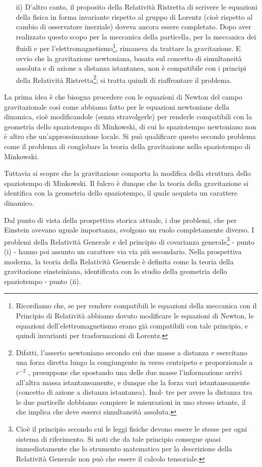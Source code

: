 \begin{enumerate}
 \item[ii)] D'altro canto, il proposito della Relatività Ristretta di scrivere le equazioni 
della fisica in forma invariante rispetto al gruppo di Lorentz (cioè
rispetto al cambio di osservatore inerziale) doveva ancora essere completato. 
Dopo aver realizzato questo scopo per la meccanica della particella, per la meccanica dei fluidi 
e per 
l'elettromagnetismo\footnote{Ricordiamo che, se per rendere compatibili le equazioni della meccanica con il Principio
di Relatività abbiamo dovuto modificare le equazioni di Newton, le equazioni dell'elettromagnetismo erano 
già compatibili con tale principio, e quindi invarianti per trasformazioni di Lorentz.},
rimaneva da trattare la gravitazione. E ovvio che la gravitazione newtoniana, 
basata sul concetto di simultaneità assoluta e di azione a distanza istantanea, non è compatibile con i principi 
della Relatività Ristretta\footnote{Difatti, l'asserto newtoniano secondo cui due masse a distanza $r$ esercitano una forza
diretta lungo la congiungente in verso centripeto e proporzionale a $r^{-2}$ , presuppone che
spostando una delle due masse l'informazione arrivi all'altra massa istantaneamente, e
dunque che la forza vari istantaneamente (concetto di azione a distanza istantanea). Inol-
tre per avere la distanza tra le due particelle dobbiamo compiere le misurazioni in uno
stesso istante, il che implica che deve esserci simultaneità assoluta.};
si tratta quindi di riaffrontare il problema.
\end{enumerate}

La prima idea è che bisogna procedere con le equazioni di Newton del 
campo gravitazionale così come abbiamo fatto per le equazioni newtoniane 
della dinamica, cioè modificandole (senza stravolgerle) per renderle compatibili 
con la geometria dello spaziotempo di Minkowski, di cui lo spaziotempo newtoniano 
non è altro che un'approssimazione locale. Si può qualificare questo secondo problema 
come il problema di conglobare la teoria della gravitazione nello
spaziotempo di Minkowski.

Tuttavia si scopre che la gravitazione comporta la modifica della struttura
dello spaziotempo di Minkowski. Il fulcro è dunque che la teoria della gravitazione 
si identifica con la geometria dello spaziotempo, il quale acquista un carattere dinamico.

Dal punto di vista della prospettiva storica attuale, i due problemi, che
per Einstein avevano uguale importanza, svolgono un ruolo completamente
diverso. I problemi della Relatività Generale e del principio di covarianza
generale\footnote{Cioè il principio secondo cui le leggi fisiche devono essere le stesse per ogni sistema
di riferimento. Si noti che da tale principio consegue quasi immediatamente che lo strumento 
matematico per la descrizione della Relatività Generale non può che essere il calcolo
tensoriale.} - punto (i) - hanno poi assunto un carattere via via più secondario.
Nella prospettiva moderna, la teoria della Relatività Generale è definita
come la teoria della gravitazione einsteiniana, identificata con lo studio della
geometria dello spaziotempo - punto (ii).

